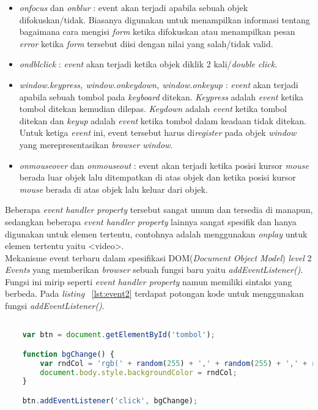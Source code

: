 \begin{itemize}
	\item \textit{onfocus} dan \textit{onblur} : event akan terjadi apabila sebuah objek difokuskan/tidak. Biasanya digunakan untuk menampilkan informasi tentang bagaimana cara mengisi \textit{form} ketika difokuskan atau menampilkan pesan \textit{error} ketika \textit{form} tersebut diisi dengan nilai yang salah/tidak valid.
	\item \textit{ondblclick} : \textit{event} akan terjadi ketika objek diklik 2 kali/\textit{double click}.
	\item \textit{window.keypress, window.onkeydown, window.onkeyup} : \textit{event} akan terjadi apabila sebuah tombol pada \textit{keyboard} ditekan. \textit{Keypress} adalah \textit{event} ketika tombol ditekan kemudian dilepas. \textit{Keydown} adalah \textit{event} ketika tombol ditekan dan \textit{keyup} adalah \textit{event} ketika tombol dalam keadaan tidak ditekan. Untuk ketiga \textit{event} ini, event tersebut harus di\textit{register} pada objek \textit{window} yang merepresentasikan \textit{browser window}.
	\item \textit{onmouseover} dan \textit{onmouseout} : event akan terjadi ketika posisi kursor \textit{mouse} berada luar objek lalu ditempatkan di atas objek dan ketika posisi kursor \textit{mouse} berada di atas objek lalu keluar dari objek. 
\end{itemize}

Beberapa \textit{event handler property} tersebut sangat umum dan tersedia di manapun, sedangkan beberapa \textit{event handler property} lainnya sangat spesifik dan hanya digunakan untuk elemen tertentu, contohnya adalah menggunakan \textit{onplay} untuk elemen tertentu yaitu <video>.\\

Mekanisme event terbaru dalam spesifikasi DOM(\textit{Document Object Model}) \textit{level} 2 \textit{Events} yang memberikan \textit{browser} sebuah fungsi baru yaitu \textit{addEventListener()}. Fungsi ini mirip seperti \textit{event handler property} namun memiliki sintaks yang berbeda. Pada \textit{listing} ~\ref{lst:event2} terdapat potongan kode untuk menggunakan fungsi \textit{addEventListener()}.

\begin{lstlisting}[language=Javascript, caption=Menggunakan fungsi addEventListener(), label={lst:event2}]

	var btn = document.getElementById('tombol');

	function bgChange() {
  		var rndCol = 'rgb(' + random(255) + ',' + random(255) + ',' + random(255) + ')';
  		document.body.style.backgroundColor = rndCol;
	}   

	btn.addEventListener('click', bgChange);
	
\end{lstlisting}


